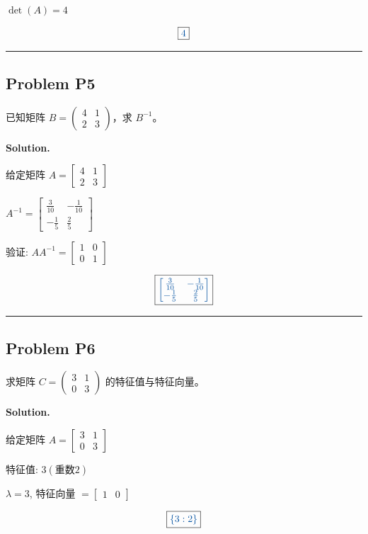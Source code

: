 \documentclass[11pt, a4paper]{ctexart}
\newcommand{\problem}[1]{\subsection*{Problem #1}}
\newcommand{\solution}{\par\noindent\textbf{Solution.}\par\smallskip}
\begin{document}
$\det(A) = 4$

\[\boxed{\textcolor{anscolor}{4}}\]

\vspace{0.6em}\hrule\vspace{0.6em}
\problem{P5}

已知矩阵 $B = \begin{pmatrix} 4 & 1 \\ 2 & 3 \end{pmatrix}$，求 $B^{-1}$。

\solution
给定矩阵 $A = \left[\begin{matrix}4 & 1\\2 & 3\end{matrix}\right]$

$A^{-1} = \left[\begin{matrix}\frac{3}{10} & - \frac{1}{10}\\- \frac{1}{5} & \frac{2}{5}\end{matrix}\right]$

验证: $A A^{-1} = \left[\begin{matrix}1 & 0\\0 & 1\end{matrix}\right]$

\[\boxed{\textcolor{anscolor}{\left[\begin{matrix}\frac{3}{10} & - \frac{1}{10}\\- \frac{1}{5} & \frac{2}{5}\end{matrix}\right]}}\]

\vspace{0.6em}\hrule\vspace{0.6em}
\problem{P6}

求矩阵 $C = \begin{pmatrix} 3 & 1 \\ 0 & 3 \end{pmatrix}$ 的特征值与特征向量。

\solution
给定矩阵 $A = \left[\begin{matrix}3 & 1\\0 & 3\end{matrix}\right]$

特征值: $3 (重数 2)$

$\lambda = 3$, 特征向量 $= \left[\begin{matrix}1 & 0\end{matrix}\right]$

\[\boxed{\textcolor{anscolor}{\left\{ 3 : 2\right\}}}\]
\end{document}
